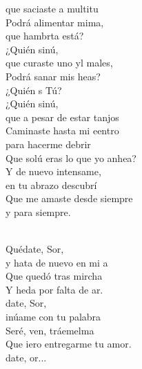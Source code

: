 \documentclass[12pt]{article}
\begin{document}
\begin{multicols*}{2}
\begin{cancion}
	que saciaste a multitu\\
	Podrá alimentar mima, \\
	que hambrta está?\\
	¿Quién sinú, \\
	que curaste uno yl males,\\
	Podrá sanar mis heas?\\
	¿Quién s Tú?\\
	¿Quién sinú,\\
	que a pesar de estar tanjos\\
	Caminaste hasta mi eentro\\
	para hacerme debrir\\
	Que solú eras lo que yo anhea?\\
	Y de nuevo intensame,\\
en tu abrazo descubrí\\
Que me amaste desde siempre\\
y para siempre.\\\jump\\
	\begin{chorus}%
	Quédate, Sor,\\
	y hata de nuevo en mi a\\
	Que  quedó tras mircha\\
	Y heda por falta de ar.\\
	date, Sor, \\
	inúame con tu palabra\\
	Seré, ven, tráemelma \\
	Que iero entregarme tu amor.\\
	date, or...          \\
	\end{chorus}%
	\jump\\
\end{cancion}%


\end{multicols*}
\end{document}
